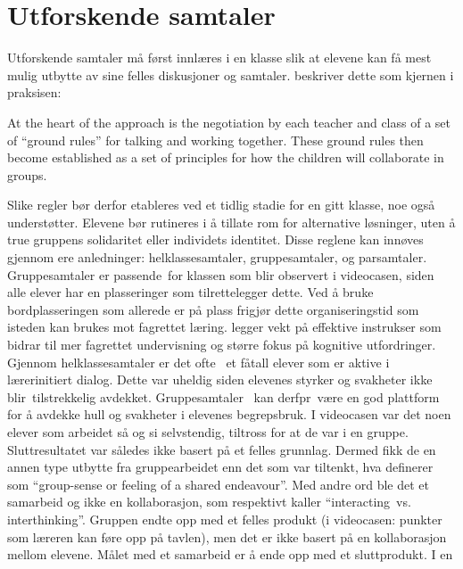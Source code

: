 \documentclass[12pt,twoside,onecolumn,norsk]{article}
\begin{document}
\section*{Utforskende samtaler}
Utforskende samtaler må først innlæres i en klasse slik at elevene kan få mest 
mulig utbytte av sine felles diskusjoner og samtaler.  
beskriver dette som kjernen i praksisen:
\begin{displayquote}
At the heart of the approach is the negotiation by each teacher and class of a set of ``ground
rules'' for talking and working together. These ground rules then become established as a set of 
principles for how the children will collaborate in groups.
\end{displayquote}
Slike regler bør derfor etableres ved et tidlig stadie for en gitt klasse, noe 
 også understøtter. Elevene bør rutineres i å tillate rom 
for alternative løsninger, uten å true gruppens solidaritet eller individets 
identitet. Disse reglene kan innøves gjennom ere anledninger: helklassesamtaler, 
gruppesamtaler, og parsamtaler. Gruppesamtaler er passende for klassen som blir 
observert i videocasen, siden alle elever har en plasseringer som tilrettelegger 
dette. Ved å bruke bordplasseringen som allerede er på plass frigjør dette 
organiseringstid som isteden kan brukes mot fagrettet læring.   
legger vekt på effektive instrukser som bidrar til mer fagrettet undervisning 
og større fokus på kognitive utfordringer. Gjennom helklassesamtaler er det ofte 
et fåtall elever som er aktive i lærerinitiert dialog. Dette var uheldig siden 
elevenes styrker og svakheter ikke blir tilstrekkelig avdekket. Gruppesamtaler 
kan derfpr være en god plattform for å avdekke hull og svakheter i elevenes 
begrepsbruk.
\newline
\newline
I videocasen var det noen elever som arbeidet så og si selvstendig, tiltross for 
at de var i en gruppe. Sluttresultatet var således ikke basert på et felles 
grunnlag. Dermed fikk de en annen type utbytte fra gruppearbeidet enn det som var 
tiltenkt, hva  definerer som ``group-sense
or feeling of a shared endeavour''. Med andre ord ble det et samarbeid og ikke en 
kollaborasjon, som   respektivt kaller ``interacting vs. 
interthinking''. Gruppen endte opp med et felles produkt (i videocasen: punkter 
som læreren kan føre opp på tavlen), men det er ikke basert på en kollaborasjon 
mellom elevene. Målet med et samarbeid er å ende opp med et sluttprodukt. I en 
\end{document}
